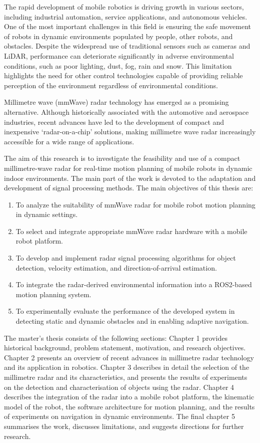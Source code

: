 The rapid development of mobile robotics is driving growth in various sectors, including industrial automation, service applications, and autonomous vehicles. One of the most important challenges in this field is ensuring the safe movement of robots in dynamic environments populated by people, other robots, and obstacles. Despite the widespread use of traditional sensors such as cameras and LiDAR, performance can deteriorate significantly in adverse environmental conditions, such as poor lighting, dust, fog, rain and snow. This limitation highlights the need for other control technologies capable of providing reliable perception of the environment regardless of environmental conditions.


Millimetre wave (mmWave) radar technology has emerged as a promising alternative. Although historically associated with the automotive and aerospace industries, recent advances have led to the development of compact and inexpensive ‘radar-on-a-chip’ solutions, making millimetre wave radar increasingly accessible for a wide range of applications. 


The aim of this research is to investigate the feasibility and use of a compact millimetre-wave radar for real-time motion planning of mobile robots in dynamic indoor environments. The main part of the work is devoted to the adaptation and development of signal processing methods.
The main objectives of this thesis are:

\begin{enumerate}
    \item To analyze the suitability of mmWave radar for mobile robot motion planning in dynamic settings.
    \item To select and integrate appropriate mmWave radar hardware with a mobile robot platform.
    \item To develop and implement radar signal processing algorithms for object detection, velocity estimation, and direction-of-arrival estimation.
    \item To integrate the radar-derived environmental information into a ROS2-based motion planning system.
    \item To experimentally evaluate the performance of the developed system in detecting static and dynamic obstacles and in enabling adaptive navigation.
\end{enumerate}


The master's thesis consists of the following sections: Chapter 1 provides historical background, problem statement, motivation, and research objectives. Chapter 2 presents an overview of recent advances in millimetre radar technology and its application in robotics. Chapter 3 describes in detail the selection of the millimetre radar and its characteristics, and presents the results of experiments on the detection and characterisation of objects using the radar. Chapter 4 describes the integration of the radar into a mobile robot platform, the kinematic model of the robot, the software architecture for motion planning, and the results of experiments on navigation in dynamic environments. The final chapter 5 summarises the work, discusses limitations, and suggests directions for further research.